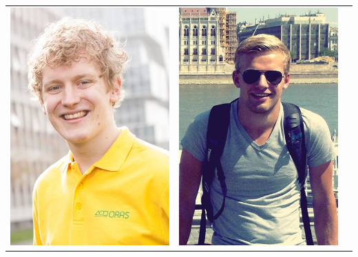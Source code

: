 \begin{titlepage}
\begin{center}
\begin{table}[ht]
\begin{tabular}{ccc}
\includegraphics[scale=0.2]{mathijs.png} &
\includegraphics[scale=0.2]{jasper.png}  \\

\end{tabular}
\end{table}
\end{center}
\end{titlepage}
